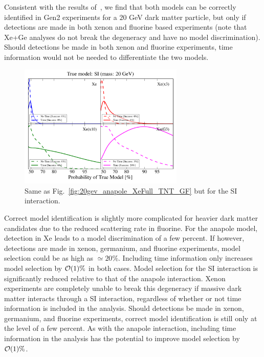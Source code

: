 \documentclass[11pt]{article}
\begin{document}
Consistent with the results of~\cite{Gluscevic:2015sqa}, we find that both models can be correctly identified in Gen2 experiments for a $20$ GeV dark matter particle, but only if detections are made in both xenon and fluorine based experiments (note that Xe+Ge analyses do not break the degeneracy and have no model discrimination). Should detections be made in both xenon and fluorine experiments, time information would not be needed to differentiate the two models.  



\begin{figure}
\centering
\includegraphics[width=0.7\textwidth]{plots/PDF_20GeV_SI_Higgs_50sims_Xe_Xe3x_Xe10x_XeG3_GF_TNT.pdf}
\caption{\label{fig:20gev_SI_Higgs_XeFull_TNT_GF}
Same as Fig.~\ref{fig:20gev_anapole_XeFull_TNT_GF} but for the SI interaction.}
\end{figure}


Correct model identification is slightly more complicated for heavier dark matter candidates due to the reduced scattering rate in fluorine. For the anapole model, detection in Xe leads to a model discrimination of a few percent. If however, detections are made in xenon, germanium, and fluorine experiments, model selection could be as high as $\simeq 20 \%$. Including time information only increases model selection by ${\cal O}(1)\%$ in both cases. Model selection for the SI interaction is significantly reduced relative to that of the anapole interaction. Xenon experiments are completely unable to break this degeneracy if massive dark matter interacts through a SI interaction, regardless of whether or not time information is included in the analysis. Should detections be made in xenon, germanium, and fluorine experiments, correct model identification is still only at the level of a few percent. As with the anapole interaction, including time information in the analysis has the potential to improve model selection by ${\cal O}(1)\%$. 
\end{document}
